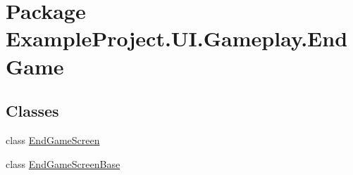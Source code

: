 \hypertarget{namespace_example_project_1_1_u_i_1_1_gameplay_1_1_end_game}{}\section{Package Example\+Project.\+U\+I.\+Gameplay.\+End\+Game}
\label{namespace_example_project_1_1_u_i_1_1_gameplay_1_1_end_game}
\subsection*{Classes}
\begin{DoxyCompactItemize}
\item 
class \hyperlink{class_example_project_1_1_u_i_1_1_gameplay_1_1_end_game_1_1_end_game_screen}{End\+Game\+Screen}
\item 
class \hyperlink{class_example_project_1_1_u_i_1_1_gameplay_1_1_end_game_1_1_end_game_screen_base}{End\+Game\+Screen\+Base}
\end{DoxyCompactItemize}
